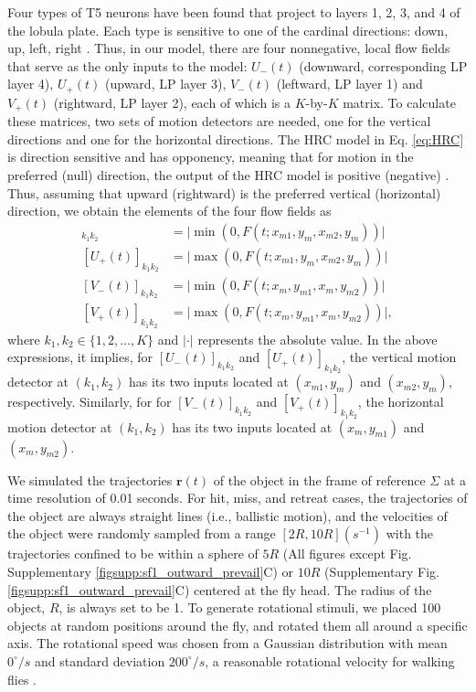 \documentclass[pdftex,9pt,lineno]{elife}
\begin{document}
Four types of T5 neurons have been found that project to layers 1, 2, 3, and 4 of the lobula plate. Each type is sensitive to one of the cardinal directions: down, up, left, right \citep{maisak2013directional}. Thus, in our model, there are four nonnegative, local flow fields that serve as the only inputs to the model: $U_{-}(t)$ (downward, corresponding LP layer 4), $U_{+}(t)$ (upward, LP layer 3), $V_{-}(t)$ (leftward, LP layer 1) and $V_{+}(t)$ (rightward, LP layer 2), each of which is a $K$-by-$K$ matrix. To calculate these matrices, two sets of motion detectors are needed, one for the vertical directions and one for the horizontal directions. The HRC model in Eq. \ref{eq:HRC} is direction sensitive and has opponency, meaning that for motion in the preferred (null) direction, the output of the HRC model is positive (negative) \citep{adelson1985spatiotemporal}. Thus, assuming that upward (rightward) is the preferred vertical (horizontal) direction, we obtain the elements of the four flow fields as
\begin{align*}
[U_{-}(t)]_{k_{1}k_{2}} &= \lvert \min(0,F(t;x_{m1},y_{m},x_{m2},y_{m})) \rvert \nonumber \\
[U_{+}(t)]_{k_{1}k_{2}} &= \lvert \max(0,F(t;x_{m1},y_{m},x_{m2},y_{m})) \rvert \nonumber \\
[V_{-}(t)]_{k_{1}k_{2}} &= \lvert \min(0,F(t;x_{m},y_{m1},x_{m},y_{m2})) \rvert  \nonumber \\
[V_{+}(t)]_{k_{1}k_{2}} &= \lvert \max(0,F(t;x_{m},y_{m1},x_{m},y_{m2})) \rvert,
\end{align*}
where $k_{1},k_{2} \in \{1,2,\dots,K\}$ and $\lvert \cdot \rvert$ represents the absolute value. In the above expressions, it implies, for $[U_{-}(t)]_{k_{1}k_{2}}$ and $[U_{+}(t)]_{k_{1}k_{2}}$, the vertical motion detector at $(k_{1},k_{2})$ has its two inputs located at $(x_{m1},y_{m})$ and $(x_{m2},y_{m})$, respectively. Similarly, for for $[V_{-}(t)]_{k_{1}k_{2}}$ and $[V_{+}(t)]_{k_{1}k_{2}}$, the horizontal motion detector at $(k_{1},k_{2})$ has its two inputs located at $(x_{m},y_{m1})$ and $(x_{m},y_{m2})$.

We simulated the trajectories $\mathbf{r}(t)$ of the object in the frame of reference $\Sigma$ at a time resolution of 0.01 seconds. For hit, miss, and retreat cases, the trajectories of the object are always straight lines (i.e., ballistic motion), and the velocities of the object were randomly sampled from a range $[2R,10R](s^{-1})$ with the trajectories confined to be within a sphere of $5R$ (All figures except Fig. Supplementary \ref{figsupp:sf1_outward_prevail}C) or $10R$ (Supplementary Fig. \ref{figsupp:sf1_outward_prevail}C) centered at the fly head. The radius of the object, $R$, is always set to be 1. To generate rotational stimuli, we placed 100 objects at random positions around the fly, and rotated them all around a specific axis. The rotational speed was chosen from a Gaussian distribution with mean $0^{\circ}/s$ and standard deviation $200^{\circ}/s$, a reasonable rotational velocity for walking flies \citep{deangelis2019manifold}.
\end{document}
